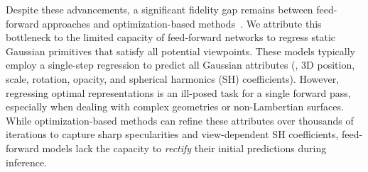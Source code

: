 \documentclass[runningheads]{llncs}
\begin{document}
Despite these advancements, a significant fidelity gap remains between feed-forward approaches and optimization-based methods~\cite{jiang2024gaussianshader,zhou2025rtr-gs,yang2024spec-gaussian,liu2024mirrorgaussian,lu2024scaffold-gs}. We attribute this bottleneck to the limited capacity of feed-forward networks to regress static Gaussian primitives that satisfy all potential viewpoints. These models typically employ a single-step regression to predict all Gaussian attributes (\ie, 3D position, scale, rotation, opacity, and spherical harmonics (SH) coefficients). However, regressing optimal representations is an ill-posed task for a single forward pass, especially when dealing with complex geometries or non-Lambertian surfaces. While optimization-based methods can refine these attributes over thousands of iterations to capture sharp specularities and view-dependent SH coefficients, feed-forward models lack the capacity to \textit{rectify} their initial predictions during inference.

\end{document}
